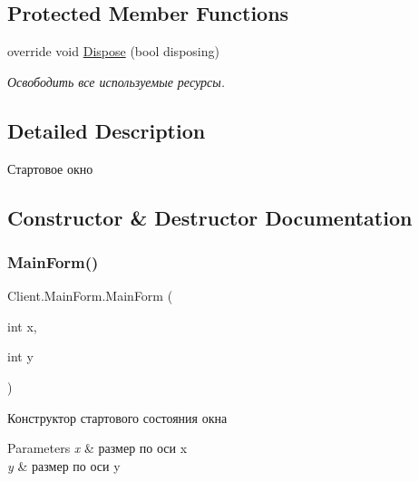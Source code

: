 \subsection*{Protected Member Functions}
\begin{DoxyCompactItemize}
\item 
override void \hyperlink{class_client_1_1_main_form_a50155117b57f40079e26d88695114488}{Dispose} (bool disposing)
\begin{DoxyCompactList}\small\item\em Освободить все используемые ресурсы. \end{DoxyCompactList}\end{DoxyCompactItemize}


\subsection{Detailed Description}
Стартовое окно 



\subsection{Constructor \& Destructor Documentation}
\hypertarget{class_client_1_1_main_form_a67c808fc65fba26e70e1e36dc083d131}{}\label{class_client_1_1_main_form_a67c808fc65fba26e70e1e36dc083d131} 
\subsubsection{\texorpdfstring{Main\+Form()}{MainForm()}}
{\footnotesize\ttfamily Client.\+Main\+Form.\+Main\+Form (\begin{DoxyParamCaption}\item[{int}]{x,  }\item[{int}]{y }\end{DoxyParamCaption})\hspace{0.3cm}{\ttfamily [inline]}}



Конструктор стартового состояния окна 


\begin{DoxyParams}{Parameters}
{\em x} & размер по оси x\\
\hline
{\em y} & размер по оси y\\
\hline
\end{DoxyParams}


